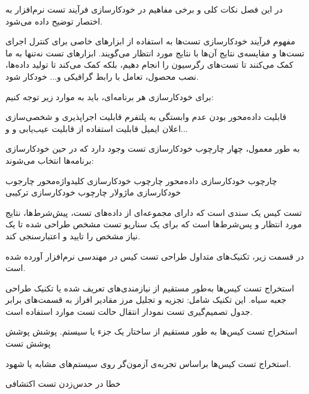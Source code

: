 

در این فصل نکات کلی و برخی مفاهیم در خودکارسازی فرآیند تست نرم‌افزار به اختصار توضیح داده می‌شود.


مفهوم فرآیند خودکارسازی تست‌ها به استفاده از ابزارهای خاصی برای کنترل اجرای تست‌ها و مقایسه‌ی نتایج آن‌ها با نتایج مورد انتظار می‌گویند. ابزارهای تست نه‌تنها به ما کمک می‌کنند تا تست‌های رگرسیون را انجام دهیم، بلکه کمک می‌کند تا تولید داده‌ها، نصب محصول، تعامل با رابط گرافیکی و... خودکار شود.

برای خودکارسازی هر برنامه‌ای، باید به موارد زیر توجه کنیم:




 قابلیت داده‌محور بودن
 عدم وابستگی به پلتفرم
 قابلیت اجراپذیری و شخصی‌سازی
 اعلان ایمیل
 قابلیت استفاده از 
 قابلیت عیب‌یابی و 
 و...


به طور معمول، چهار چارچوب خودکارسازی تست وجود دارد که در حین خودکارسازی برنامه‌ها انتخاب می‌شوند:


 چارچوب خودکارسازی داده‌محور
 چارچوب خودکارسازی کلیدواژه‌محور
 چارجوب خودکارسازی ماژولار
 چارچوب خودکارسازی ترکیبی




تست کیس یک سندی است که دارای مجموعه‌ای از داده‌های تست، پیش‌شرط‌ها، نتایج مورد انتظار و پس‌شرط‌ها است که برای یک سناریو تست مشخص طراحی شده تا یک نیاز مشخص را تایید و اعتبارسنجی کند.


در قسمت زیر، تکنیک‌های متداول طراحی تست کیس در مهندسی نرم‌افزار آورده شده است.

 استخراج تست کیس‌ها به‌طور مستقیم از نیازمندی‌های تعریف شده یا تکنیک طراحی جعبه سیاه. این تکنیک شامل:
	 تجزیه و تجلیل مرز مقادیر
	 افراز به قسمت‌های برابر
	 جدول تصمیم‌گیری تست
	 نمودار انتقال حالت
	 تست موارد استفاده
است.



 استخراج تست کیس‌ها به طور مستقیم از ساختار یک جزء یا سیستم.
 پوشش 
 پوشش 
 پوشش 
 تست 

  استخراج تست کیس‌ها براساس تجربه‌ی آزمون‌گر روی سیستم‌های مشابه یا شهود.

 خطا در حدس‌زدن
 تست اکتشافی
